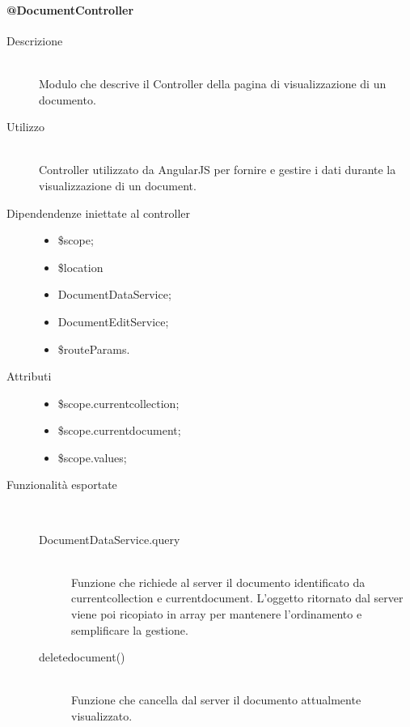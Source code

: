 \paragraph{@DocumentController}
\begin{description}
 \item[Descrizione] \hfill \\
 Modulo che descrive il Controller della pagina di visualizzazione di un documento.
 
 \item[Utilizzo] \hfill \\
 Controller utilizzato da AngularJS per fornire e gestire i dati durante la visualizzazione di un document.
 
 \item[Dipendendenze iniettate al controller] \hfill
 \begin{itemize}
  \item \$scope;
  \item \$location
  \item DocumentDataService;
  \item DocumentEditService;
  \item \$routeParams.
 \end{itemize}
 
 \item[Attributi] \hfill
 \begin{itemize}
 \item  \$scope.current\textunderscore collection;
 \item  \$scope.current\textunderscore document;
 \item  \$scope.values;
 \end{itemize}
 
 \item[Funzionalità esportate] \hfill \\
 \begin{description}
  \item[DocumentDataService.query] \hfill \\
  Funzione che richiede al server il documento identificato da current\textunderscore collection e current\textunderscore document.
  L'oggetto ritornato dal server viene poi ricopiato in array per mantenere l'ordinamento e semplificare la gestione.
  \item[delete\textunderscore document()] \hfill \\
  Funzione che cancella dal server il documento attualmente visualizzato.
 \end{description}
\end{description}

